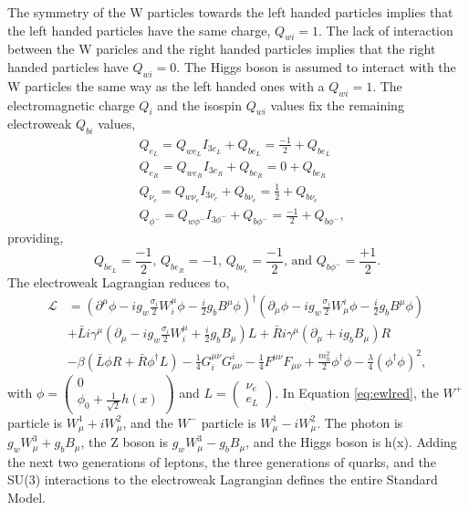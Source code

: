 The symmetry of the W particles towards the left handed particles implies that the left handed particles have the same charge, $Q_{wi} = 1$. The lack of interaction between the W paricles and the right handed particles implies that the right handed particles have $Q_{wi} = 0$. The Higgs boson is assumed to interact with the W particles the same way as the left handed ones with a $Q_{wi} = 1$. The electromagnetic charge $Q_i$ and the isospin $Q_{wi}$ values fix the remaining electroweak $Q_{bi}$ values, 
\begin{equation}
\begin{split}
&Q_{e_L} = Q_{we_L}I_{3e_L} + Q_{be_L} = \frac{-1}{2} + Q_{be_L} \\
&Q_{e_R} = Q_{we_R}I_{3e_R} + Q_{be_R} = 0 + Q_{be_R} \\
&Q_{\nu_e} = Q_{w\nu_e}I_{3\nu_e} + Q_{b\nu_e} = \frac{1}{2} + Q_{b\nu_e} \\
&Q_{\phi^-} = Q_{w\phi^-}I_{3\phi^-} + Q_{b\phi^-} = \frac{-1}{2} + Q_{b\phi^-},
\end{split}
\end{equation}
providing, 
\begin{equation}
Q_{be_L} = \frac{-1}{2}\text{, } Q_{be_R} = -1 \text{, } Q_{b\nu_e} = \frac{-1}{2} \text{, and } Q_{b\phi^-} = \frac{+1}{2}.
\end{equation}
The electroweak Lagrangian reduces to,
\begin{equation}
\label{eq:ewlred}
\begin{split}
\mathcal{L} &= (\partial^\mu\phi - ig_{w}\frac{\sigma_i}{2}W_i^\mu\phi - \frac{i}{2}g_{b}B^\mu\phi)^\dagger
               (\partial_\mu\phi - ig_{w}\frac{\sigma_i}{2}W^i_\mu\phi - \frac{i}{2}g_{b}B^\mu\phi) \\ 
            &+ \bar{L}i\gamma^\mu(\partial_\mu - ig_{w}\frac{\sigma_i}{2}W_i^\mu + \frac{i}{2}g_{b}B_\mu)L + \bar{R}i\gamma^\mu(\partial_\mu + ig_{b}B_\mu)R \\
            &- \beta(\bar{L}\phi R + \bar{R}\phi^\dagger L) 
             - \frac{1}{4}G_i^{\mu\nu}G^i_{\mu\nu} -\frac{1}{4}F^{\mu\nu}F_{\mu\nu} + \frac{m_h^2}{2}\phi^\dagger\phi - \frac{\lambda}{4}(\phi^\dagger\phi)^2,
\end{split}
\end{equation}
with $\phi = \begin{pmatrix} 0 \\ \phi_0 + \frac{1}{\sqrt{2}}h(x) \end{pmatrix}$ and $L = \begin{pmatrix} \nu_e \\ e_L \end{pmatrix}$. In Equation \ref{eq:ewlred}, the $W^+$ particle is $W^1_\mu+iW^2_\mu$, and the $W^-$ particle is $W^1_\mu - iW^2_\mu$. The photon is $g_{w}W^3_\mu + g_{b}B_\mu$, the Z boson is $g_{w}W^3_\mu - g_{b}B_\mu$, and the Higgs boson is h(x). Adding the next two generations of leptons, the three generations of quarks, and the SU(3) interactions to the electroweak Lagrangian defines the entire Standard Model.   
